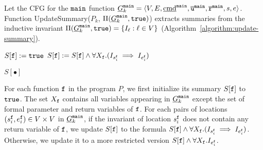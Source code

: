Let the CFG for the $\mathtt{{main}}$ function $\underline{G}^{\mathtt{{main}}}_k = \langle V, E, \underline{\textmd{cmd}}^{\mathtt{{main}}}, \overline{\mathtt{u}}^{\mathtt{{main}}}, \overline{\mathtt{r}}^{\mathtt{{main}}},s,e \rangle$.
Function 
UpdateSummary($P_k$, $\Pi (\underline{G}^{\mathtt{{main}}}_k, \mathtt{true})$)
extracts summaries from the inductive invariant $\Pi (\underline{G}^{\mathtt{{main}}}_k, \mathtt{true})= \{ I_\ell : \ell \in V
\}$ (Algorithm~\ref{algorithm:update-summary}). 

\begin{algorithm}

  {	
  	$S[\mathtt{{f}}]:=\mathtt{true}$\;
   	{
       	{
         		$S[\mathtt{{f}}]:=S[\mathtt{{f}}]\wedge \forall X_\mathtt{f}. (I_{s_i^{\mathtt{{f}}}} \implies I_{e_i^{\mathtt{{f}}}})$\;
       	}
   	}
    
  }
 
  \Return $S[\bullet]$\;
  \caption{
  $\textmd{UpdateSummary}(P_k, \Pi (\underline{G}^{\fun{main}}_k, \TT))$}
  \label{algorithm:update-summary}
\end{algorithm}

For each function $\mathtt{{f}}$ in the program $P$, we first initialize its summary $S[\mathtt{{f}}]$ to $\mathtt{true}$.
The set $X_{\mathtt{{f}}}$ contains all variables appearing in $\underline{G}^{\mathtt{{main}}}_k$ except the set of formal parameter and return variables of $\mathtt{{f}}$.
For each pairs of locations $(s_i^{\mathtt{{f}}},e_i^{\mathtt{{f}}})\in V\times V$ in $\underline{G}^{\mathtt{{main}}}_k$, if the invariant of location $s_i^{\mathtt{{f}}}$ does not contain any return variable of $\mathtt{{f}}$, we update $S[\mathtt{{f}}]$ to the formula $S[\mathtt{{f}}]\wedge \forall X_{\mathtt{{f}}}. (I_{s_i^{\mathtt{{f}}}} \implies I_{e_i^{\mathtt{{f}}}})$. Otherwise, we update it to a more restricted version $S[\mathtt{{f}}]\wedge \forall X_{\mathtt{{f}}}.I_{e_i^{\mathtt{{f}}}}$.

